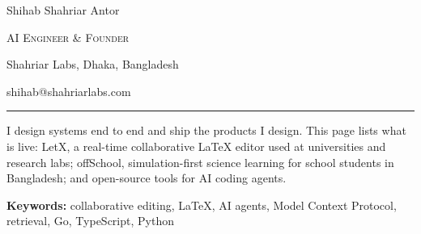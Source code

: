 \documentclass[border={4pt 8pt 4pt 8pt},varwidth=15.6cm]{standalone}
\begin{document}
\color{ink}%
\begin{minipage}[c]{0.9cm}
\end{minipage}%
\begin{minipage}[c]{14.6cm}\centering
  {\fontsize{27}{31}\selectfont Shihab Shahriar Antor\par}
  \vspace{0.6em}
  {\large\scshape AI Engineer \& Founder\par}
  \vspace{0.25em}
  {\large Shahriar Labs, Dhaka, Bangladesh\par}
  \vspace{0.3em}
  {\normalsize\ttfamily\color{accent}shihab@shahriarlabs.com\par}
  \vspace{0.9em}
  {\color{accent}\rule{2.4cm}{0.7pt}\par}
  \vspace{0.8em}
  \begin{minipage}{12.2cm}\small
    \par\vspace{0.4em}
    \noindent\parbox{\linewidth}{I design systems end to end and ship the products I design.
    This page lists what is live: LetX, a real-time collaborative \LaTeX{} editor used at
    universities and research labs; offSchool, simulation-first science learning for school
    students in Bangladesh; and open-source tools for AI coding agents.}\par
    \vspace{0.7em}
    \noindent\parbox{\linewidth}{{\bfseries Keywords:} collaborative editing, \LaTeX, AI agents,
    Model Context Protocol, retrieval, Go, TypeScript, Python}
  \end{minipage}
\end{minipage}
\end{document}
